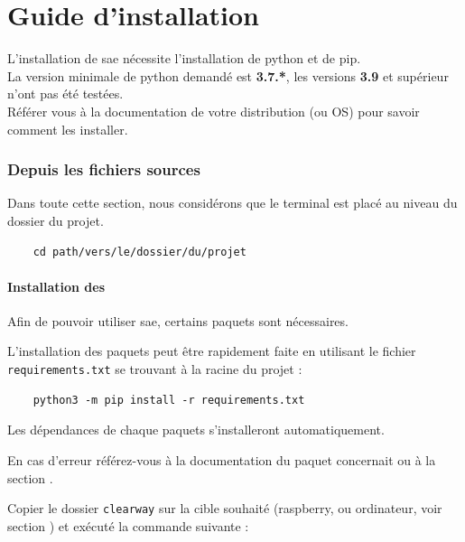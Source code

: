 \part{Guide d'installation}

L'installation de \gls{sae} nécessite l'installation de \gls{python} et de \gls{pip}.\\
La version minimale de \gls{python} demandé est \textbf{3.7.*}, les versions \textbf{3.9} et supérieur n'ont pas été
testées.\\
Référer vous à la documentation de votre distribution (ou OS) pour savoir comment les installer.

\section{Depuis les fichiers sources}

Dans toute cette section, nous considérons que le terminal est placé au niveau du dossier du projet.

\begin{verbatim}
    cd path/vers/le/dossier/du/projet
\end{verbatim}

\subsection{Installation des }

Afin de pouvoir utiliser \gls{sae}, certains \glspl{paquet} sont nécessaires.\newline

L'installation des \glspl{paquet} peut être rapidement faite en utilisant le fichier \texttt{requirements.txt} se
trouvant à la racine du projet :

\begin{verbatim}
    python3 -m pip install -r requirements.txt
\end{verbatim}

Les dépendances de chaque \glspl{paquet} s'installeront automatiquement.\newline

En cas d'erreur référez-vous à la documentation du \gls{paquet} concernait ou à la section .\newline

Copier le dossier \texttt{clearway} sur la cible souhaité (\gls{raspberry}, ou ordinateur, voir section
) et exécuté la commande suivante :

